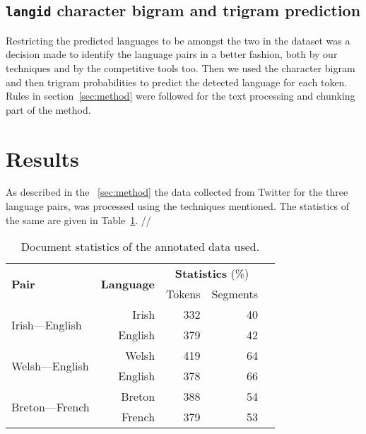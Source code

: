 \documentclass[11pt]{article}
\begin{document}
\subsection{\texttt{langid} character bigram and trigram prediction}
\label{langidstuff}

Restricting the predicted languages to be amongst the two in the dataset was a decision made to identify the language pairs in a better fashion, both by our techniques and by the competitive tools too. Then we used the character bigram and then trigram probabilities to predict the detected language for each token. Rules in section~\ref{sec:method} were followed for the text processing and chunking part of the method.

\section{Results}
\label{sec:results}
As described in the ~\ref{sec:method} the data collected from Twitter for the three language pairs, was processed using the techniques mentioned. The statistics of the same are given in Table~\ref{table:datastats}. // 

\begin{table}
\begin{center}
\begin{tabular}{|l|r|r|r|r}
\hline
\multirow{2}{*}{\textbf{Pair}} & \multirow{2}{*}{\textbf{Language}}  & \multicolumn{2}{c|}{\textbf{Statistics} (\%)} \\\cline{3-4}
                &  &  Tokens & Segments \\
\hline
\multirow{2}{*}{Irish---English} & Irish & 332 & 40 \\
                                 & English & 379 & 42 \\
\hline
\multirow{2}{*}{Welsh---English} & Welsh & 419 & 64 \\
                                 & English & 378 & 66  \\
\hline
\multirow{2}{*}{Breton---French} & Breton & 388 & 54 \\
                                 & French & 379 & 53  \\
\hline
\end{tabular}
\end{center}
\caption{Document statistics of the annotated data used. }
\label{table:datastats}
\end{table}
\end{document}
